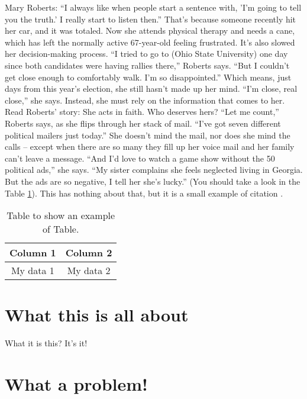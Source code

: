 \documentclass[%
        TwoSidePages,%
        English,%
        FinalVersion,%
        Copyright,%
        TablesPage,%
        FiguresPage,%
        ]%
{ic-tese-v2}
\begin{document}
Mary Roberts: ``I always like when people start a sentence with, 'I'm going to tell you the truth.' I really start to listen then.''
That's because someone recently hit her car, and it was totaled. Now she attends physical therapy and needs a cane, which has left the normally active 67-year-old feeling frustrated. It's also slowed her decision-making process.
``I tried to go to (Ohio State University) one day since both candidates were having rallies there,'' Roberts says. ``But I couldn't get close enough to comfortably walk. I'm so disappointed.''
Which means, just days from this year's election, she still hasn't made up her mind.
``I'm close, real close,'' she says.
Instead, she must rely on the information that comes to her.
Read Roberts' story: She acts in faith. Who deserves hers?
``Let me count,'' Roberts says, as she flips through her stack of mail. ``I've got seven different political mailers just today.''
She doesn't mind the mail, nor does she mind the calls -- except when there are so many they fill up her voice mail and her family can't leave a message.
``And I'd love to watch a game show without the 50 political ads,'' she says. ``My sister complains she feels neglected living in Georgia. But the ads are so negative, I tell her she's lucky.'' (You should take a look in the Table \ref{Tab:example}). This has nothing about that, but it is a small example of citation \cite{smallest_example2013}.

\begin{table}
        \center
        \caption{Table to show an example of Table.}
        \label{Tab:example}
        \begin{tabular}{c|c}
                \hline
                        Column 1 & Column 2\\
                \hline
                        My data 1 & My data 2\\
                \hline
        \end{tabular}
\end{table}

\section{What this is all about}

What it is this? It's it!

\section{What a problem!}
\end{document}
